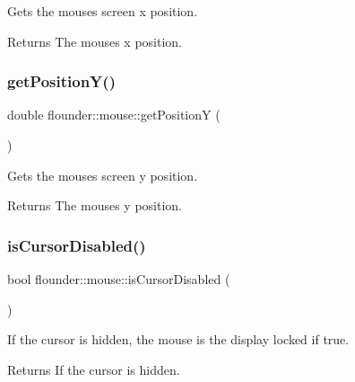 Gets the mouses screen x position. 

\begin{DoxyReturn}{Returns}
The mouses x position. 
\end{DoxyReturn}
\mbox{\label{classflounder_1_1mouse_adbb426aed882bf8919171e263bd038f3}} 
\subsubsection{\texorpdfstring{get\+Position\+Y()}{getPositionY()}}
{\footnotesize\ttfamily double flounder\+::mouse\+::get\+PositionY (\begin{DoxyParamCaption}{ }\end{DoxyParamCaption})}



Gets the mouses screen y position. 

\begin{DoxyReturn}{Returns}
The mouses y position. 
\end{DoxyReturn}
\mbox{\label{classflounder_1_1mouse_a84181116f71d9f8e3c01afca2aa2554f}} 
\subsubsection{\texorpdfstring{is\+Cursor\+Disabled()}{isCursorDisabled()}}
{\footnotesize\ttfamily bool flounder\+::mouse\+::is\+Cursor\+Disabled (\begin{DoxyParamCaption}{ }\end{DoxyParamCaption})}



If the cursor is hidden, the mouse is the display locked if true. 

\begin{DoxyReturn}{Returns}
If the cursor is hidden. 
\end{DoxyReturn}
\mbox{\label{classflounder_1_1mouse_a68cff5b3c6384eda1048db5894d65887}} 
